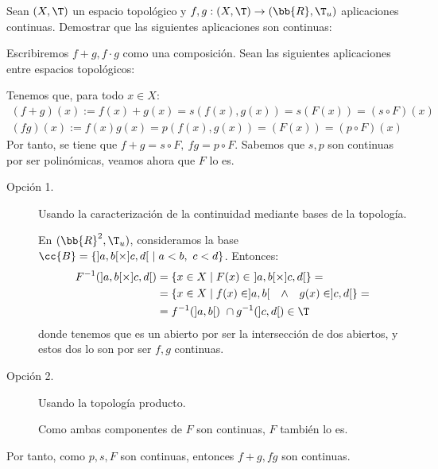 \begin{ejercicio}
    Sean $(X, \T)$ un espacio topológico y $f, g:(X, \T) \to (\bb{R},\T_u)$ aplicaciones continuas. Demostrar que las siguientes aplicaciones son continuas:

    Escribiremos $f+g,f\cdot g$ como una composición. Sean las siguientes aplicaciones entre espacios topológicos:
    \begin{figure}[H]
        \centering
        \begin{subfigure}{0.35\linewidth}
            \centering
        \end{subfigure}\hspace{1cm}
        \begin{subfigure}{0.35\linewidth}
            \centering
        \end{subfigure}
    \end{figure}

    Tenemos que, para todo $x\in X$:
    \begin{gather*}
        (f+g)(x):=f(x)+g(x)=s(f(x),g(x))=s(F(x))=(s\circ F)(x)\\
        (fg)(x):=f(x)g(x)=p(f(x),g(x))=(F(x))=(p\circ F)(x)
    \end{gather*}
    Por tanto, se tiene que $f+g=s\circ F,~fg=p\circ F$. Sabemos que $s,p$ son continuas por ser polinómicas, veamos ahora que $F$ lo es.
    
    \begin{description}
        \item[Opción 1.] Usando la caracterización de la continuidad mediante bases de la topología.

        En $(\bb{R}^2,\T_u)$, consideramos la base $\cc{B}=\{]a,b[\times ]c,d[~ \mid a<b,~ c<d\}$. Entonces:
        \begin{equation*}
            \begin{split}
                F^{-1}(]a,b[\times ]c,d[)
                &= \left\{
                x\in X\mid F(x)\in~  ]a,b[\times]c,d[
                \right\}
                =\\&= \left\{
                x\in X\mid f(x)\in ]a,b[ \quad \land \quad g(x)\in ]c,d[
                \right\}
                =\\&= f^{-1}(]a,b[)~ \cap g^{-1}(]c,d[)\in \T
            \end{split}
        \end{equation*}
        donde tenemos que es un abierto por ser la intersección de dos abiertos, y estos dos lo son por ser $f,g$ continuas.

        \item[Opción 2.] Usando la topología producto.

        Como ambas componentes de $F$ son continuas, $F$ también lo es.
    \end{description}
    Por tanto, como $p,s,F$ son continuas, entonces $f+g,fg$ son continuas.
\end{ejercicio}


